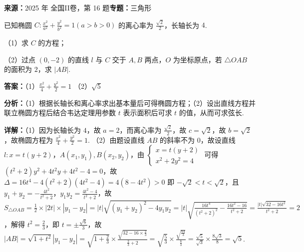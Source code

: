 \begin{question}[points=15]
\textbf{来源：}2025 年 全国II卷，第 16 题\quad \textbf{专题：}三角形\par
已知椭圆 $C:\frac{x^2}{a^2}+\frac{y^2}{b^2}=1(a>b>0)$ 的离心率为 $\frac{\sqrt{2}}{2}$，长轴长为 $4$.

（1）求 $C$ 的方程；

（2）过点 $(0,-2)$ 的直线 $l$ 与 $C$ 交于 $A,B$ 两点，$O$ 为坐标原点，若 $\triangle OAB$ 的面积为 $2$，求 $|AB|$.
\begin{solution}
\textbf{答案：}（1）$\frac{x^2}{4}+\frac{y^2}{2}=1$
（2）$\sqrt{5}$

\textbf{分析：}（1）根据长轴长和离心率求出基本量后可得椭圆方程；（2）设出直线方程并联立椭圆方程后结合韦达定理用参数 $t$ 表示面积后可求 $t$ 的值，从而可求弦长.

\textbf{详解：}（1）因为长轴长为 $4$，故 $a=2$，而离心率为 $\frac{\sqrt{2}}{2}$，故 $c=\sqrt{2}$，故 $b=\sqrt{2}$，故椭圆方程为 $\frac{x^2}{4}+\frac{y^2}{2}=1$.
（2）由题设直线 $AB$ 的斜率不为 $0$，故设直线 $l:x=t(y+2)$，$A(x_1,y_1),B(x_2,y_2)$，由 $\begin{cases}x=t(y+2)\\x^2+2y^2=4\end{cases}$ 可得 $(t^2+2)y^2+4t^2y+4t^2-4=0$，故 $\Delta=16t^4-4(t^2+2)(4t^2-4)=4(8-4t^2)>0$ 即 $-\sqrt{2}<t<\sqrt{2}$，且 $y_1+y_2=-\frac{4t^2}{t^2+2}$，$y_1y_2=\frac{4t^2-4}{t^2+2}$，故 $S_{\triangle OAB}=\frac{1}{2}\times|2t|\times|y_1-y_2|=|t|\sqrt{(y_1+y_2)^2-4y_1y_2}=|t|\sqrt{\frac{16t^4}{(t^2+2)^2}-\frac{16t^2-16}{t^2+2}}=\frac{|t|\sqrt{32-16t^2}}{t^2+2}=2$，解得 $t^2=\frac{2}{3}$，即 $t=\pm\frac{\sqrt{6}}{3}$，故 $|AB|=\sqrt{1+t^2}|y_1-y_2|=\sqrt{1+\frac{2}{3}}\times\frac{\sqrt{32-16\times\frac{2}{3}}}{\frac{2}{3}+2}=\sqrt{\frac{5}{3}}\times\frac{\sqrt{\frac{64}{3}}}{\frac{8}{3}}=\frac{\sqrt{5}}{\sqrt{3}}\times\frac{8\sqrt{3}}{8}=\sqrt{5}$.
\end{solution}
\end{question}

